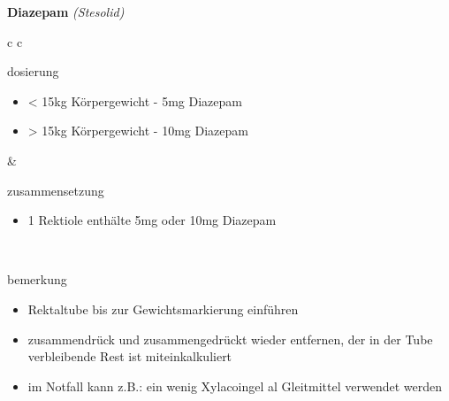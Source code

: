 \begin{frame}{
    \textbf{Diazepam}
    \textit{(Stesolid)}
}
    \begin{tabular}{c c}
        \begin{beamercolorbox}[wd=\boxwidth\textwidth,ht=\boxheight\textheight,sep=1em]{dosierung}
            \begin{itemize}
                \item < 15kg Körpergewicht - 5mg Diazepam
                \item > 15kg Körpergewicht - 10mg Diazepam
            \end{itemize}
        \end{beamercolorbox} & 
        \begin{beamercolorbox}[wd=\boxwidth\textwidth,ht=\boxheight\textheight,sep=1em]{zusammensetzung}
            \begin{itemize}
                \item 1 Rektiole enthälte 5mg oder 10mg Diazepam
            \end{itemize}
        \end{beamercolorbox} \\
        \begin{beamercolorbox}[wd=\textwidth,ht=\boxheight\textheight,sep=1em]{bemerkung}
            \begin{itemize}
                \item Rektaltube bis zur Gewichtsmarkierung einführen
                \item zusammendrück und zusammengedrückt wieder entfernen, der in der Tube verbleibende Rest ist miteinkalkuliert
                \item im Notfall kann z.B.: ein wenig Xylacoingel al Gleitmittel verwendet werden
            \end{itemize}
        \end{beamercolorbox} \\
    \end{tabular}
\end{frame}

